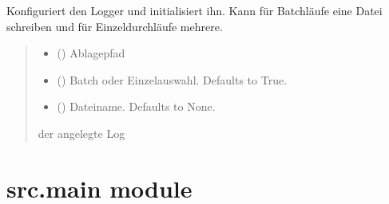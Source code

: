 \documentclass[a4paper,10pt,ngerman]{sphinxmanual}
\begin{document}
\begin{fulllineitems}
\label{\detokenize{api:src.logger_setup.setup_logger}}
\pysigstartsignatures
\pysiglinewithargsret
{}
{\sphinxparamcomma {}\sphinxparamcomma {}}
{}
\pysigstopsignatures
\sphinxAtStartPar
Konfiguriert den Logger und initialisiert ihn. Kann für Batchläufe eine Datei schreiben und für Einzeldurchläufe mehrere.
\begin{quote}\begin{description}
\begin{itemize}
\item {} 
\sphinxAtStartPar
{} () \textendash{} Ablagepfad

\item {} 
\sphinxAtStartPar
{} () \textendash{} Batch\sphinxhyphen{} oder Einzelauswahl. Defaults to True.

\item {} 
\sphinxAtStartPar
{} () \textendash{} Dateiname. Defaults to None.

\end{itemize}

\sphinxAtStartPar
der angelegte Log

\sphinxAtStartPar
{}

\end{description}\end{quote}

\end{fulllineitems}



\section{src.main module}
\label{\detokenize{api:module-src.main}}\label{\detokenize{api:src-main-module}}
\end{document}
